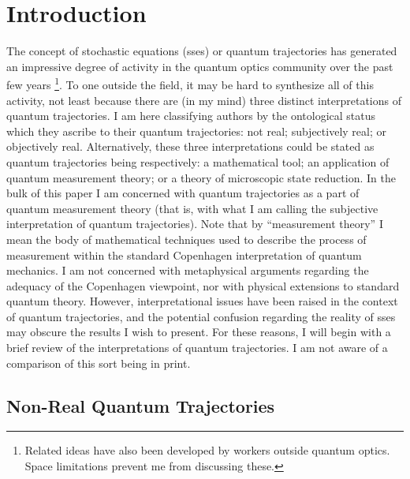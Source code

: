 \documentclass[12pt]{article}
\begin{document}


\newpage

\section{Introduction}

The concept of stochastic \sch equations ({\sc sse}s) \cite{DalCasMol92} or quantum
trajectories \cite{Car93b} has generated an impressive degree of activity in the
quantum optics community over the past few years \footnote{Related ideas have also
been developed by workers outside quantum optics. Space limitations prevent me from
discussing these.}. To one outside the field, it may be hard to synthesize all of
this activity, not least because there are (in my mind) three distinct
interpretations of quantum trajectories. I am here classifying authors by the
ontological status which they ascribe to their quantum trajectories: not real;
subjectively real; or objectively real. Alternatively, these three interpretations
could be stated as quantum trajectories being respectively: a mathematical tool; an
application of quantum measurement theory; or a theory of microscopic state
reduction. In the bulk of this paper I am concerned with quantum trajectories as a
part of quantum measurement theory (that is, with what I am calling the subjective
interpretation of quantum trajectories). Note that by ``measurement theory'' I mean
the body of mathematical techniques used to describe the process of measurement
within the standard Copenhagen interpretation \cite{Boh58,Hei59} of quantum
mechanics. I am not concerned with  metaphysical arguments regarding the adequacy of
the Copenhagen viewpoint, nor with physical extensions to standard quantum theory.
However, interpretational issues have been raised in the context of quantum
trajectories, and the potential confusion regarding the reality of {\sc sse}s may
obscure the results I wish to present. For these reasons, I will begin with a brief
review of the interpretations of quantum trajectories. I am not aware of a
comparison of this sort being in print.

\subsection{Non-Real Quantum Trajectories}
\end{document}
